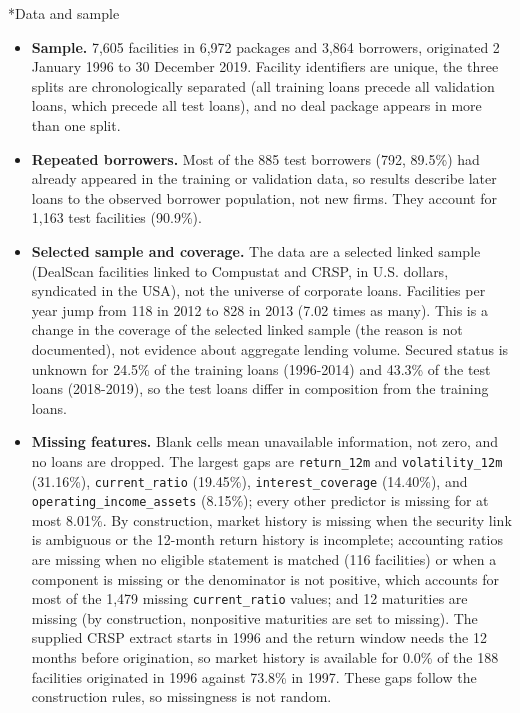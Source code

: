 \documentclass[9pt,letterpaper]{extarticle}
\makeatletter
\renewcommand\section{\@startsection{section}{1}{\z@}{6pt plus 2pt minus 1pt}{3pt plus 1pt}%
  {\normalfont\large\bfseries\color{navy}}}
\makeatother
\begin{document}
\section*{Data and sample}
\begin{itemize}
  \item \textbf{Sample.} 7,605 facilities in 6,972 packages and 3,864 borrowers, originated 2 January 1996 to 30 December 2019. Facility identifiers are unique, the three splits are chronologically separated (all training loans precede all validation loans, which precede all test loans), and no deal package appears in more than one split.
  \item \textbf{Repeated borrowers.} Most of the 885 test borrowers (792, 89.5\%) had already appeared in the training or validation data, so results describe later loans to the observed borrower population, not new firms. They account for 1,163 test facilities (90.9\%).
  \item \textbf{Selected sample and coverage.} The data are a selected linked sample (DealScan facilities linked to Compustat and CRSP, in U.S. dollars, syndicated in the USA), not the universe of corporate loans. Facilities per year jump from 118 in 2012 to 828 in 2013 (7.02 times as many). This is a change in the coverage of the selected linked sample (the reason is not documented), not evidence about aggregate lending volume. Secured status is unknown for 24.5\% of the training loans (1996-2014) and 43.3\% of the test loans (2018-2019), so the test loans differ in composition from the training loans.
  \item \textbf{Missing features.} Blank cells mean unavailable information, not zero, and no loans are dropped. The largest gaps are \mbox{\texttt{return\_12m}} and \mbox{\texttt{volatility\_12m}} (31.16\%), \mbox{\texttt{current\_ratio}} (19.45\%), \mbox{\texttt{interest\_coverage}} (14.40\%), and \mbox{\texttt{operating\_income\_assets}} (8.15\%); every other predictor is missing for at most 8.01\%. By construction, market history is missing when the security link is ambiguous or the 12-month return history is incomplete; accounting ratios are missing when no eligible statement is matched (116 facilities) or when a component is missing or the denominator is not positive, which accounts for most of the 1,479 missing \mbox{\texttt{current\_ratio}} values; and 12 maturities are missing (by construction, nonpositive maturities are set to missing). The supplied CRSP extract starts in 1996 and the return window needs the 12 months before origination, so market history is available for 0.0\% of the 188 facilities originated in 1996 against 73.8\% in 1997. These gaps follow the construction rules, so missingness is not random.

\end{itemize}
\end{document}
